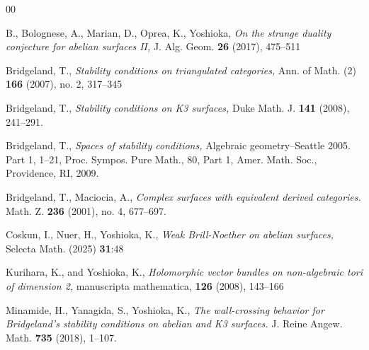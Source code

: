 \documentclass[10pt]{amsart}
\def\cal{\mathcal}
\newcommand{\Hom}{\operatorname{Hom}}
\numberwithin{equation}{section}
\theoremstyle{plain}
\theoremstyle{definition}
\theoremstyle{remark}
\begin{document}









\begin{thebibliography}{00}

B., Bolognese, A., Marian, D., Oprea, K., Yoshioka, 
{\it On the strange duality conjecture for abelian surfaces II,}
J. Alg. Geom. {\bf 26} (2017), 475--511

Bridgeland, T.,
{\it Stability conditions on triangulated categories,}
Ann. of Math. (2)  {\bf 166}  (2007),  no. 2, 317--345

Bridgeland, T.,
{\it Stability conditions on K3 surfaces,}
Duke Math. J.  {\bf 141} (2008), 241--291.

Bridgeland, T.,
{\it Spaces of stability conditions,}
Algebraic geometry--Seattle 2005. Part 1,  1--21, 
Proc. Sympos. Pure Math., 80, Part 1, Amer. Math. Soc., 
Providence, RI, 2009.

Bridgeland, T., Maciocia, A.,
{\it Complex surfaces with equivalent derived categories.}
Math. Z. {\bf 236} (2001), no. 4, 677--697. 



Coskun, I., Nuer, H., Yoshioka, K.,
{\it Weak Brill-Noether on abelian surfaces,}
Selecta Math. (2025) {\bf 31}:48

Kurihara, K., and Yoshioka, K.,
{\it Holomorphic vector bundles on non-algebraic tori of dimension 2,}
manuscripta mathematica, {\bf 126} (2008), 143--166 






Minamide, H., Yanagida, S., Yoshioka, K., 
{\it The wall-crossing behavior for Bridgeland's stability conditions on abelian and K3 surfaces.}
J. Reine Angew. Math. {\bf 735} (2018), 1--107. 



\end{thebibliography}
\end{document}
